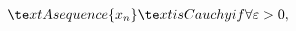 \documentclass[preview]{standalone}
\begin{document}
\begin{align*}
\te x t{A sequence } \{ x _n\} \te x t{ is Cauchy if } \forall \varepsilon > 0,
\end{align*}
\end{document}
